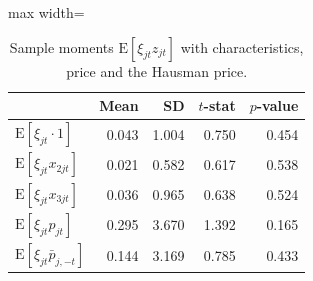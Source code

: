 \begin{table}[H]
\centering\small
\caption{Sample moments $\mathrm{E}[\xi_{jt}z_{jt}]$ with characteristics, price and the Hausman price.}\label{tab:q7a_moments}
\begin{adjustbox}{max width=\linewidth}
\begin{tabular}{lrrrr}
\toprule
 & Mean & SD & $t$-stat & $p$-value \\
\midrule
$\mathrm{E}[\xi_{jt}\cdot 1]$ & 0.043 & 1.004 & 0.750 & 0.454 \\
$\mathrm{E}[\xi_{jt}x_{2jt}]$ & 0.021 & 0.582 & 0.617 & 0.538 \\
$\mathrm{E}[\xi_{jt}x_{3jt}]$ & 0.036 & 0.965 & 0.638 & 0.524 \\
$\mathrm{E}[\xi_{jt}p_{jt}]$ & 0.295 & 3.670 & 1.392 & 0.165 \\
$\mathrm{E}[\xi_{jt}\bar p_{j,-t}]$ & 0.144 & 3.169 & 0.785 & 0.433 \\
\bottomrule
\end{tabular}
\end{adjustbox}
\par{}
\end{table}

